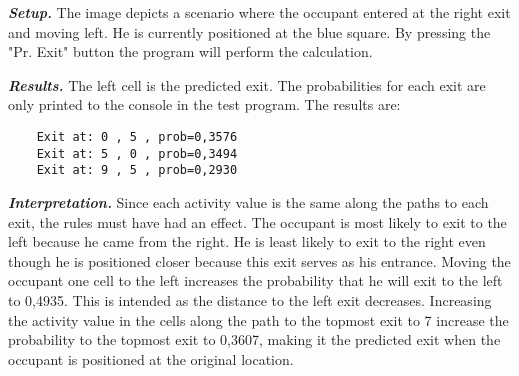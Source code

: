 \textit{\textbf{Setup.}} The image depicts a scenario where the occupant entered at the right exit and moving left. He is currently positioned at the blue square. By pressing the "Pr. Exit" button the program will perform the calculation. 

\textit{\textbf{Results.}} The left cell is the predicted exit. The probabilities for each exit are only printed to the console in the test program. The results are:
\begin{verbatim}
    Exit at: 0 , 5 , prob=0,3576
    Exit at: 5 , 0 , prob=0,3494
    Exit at: 9 , 5 , prob=0,2930
\end{verbatim}

\textit{\textbf{Interpretation.}} Since each activity value is the same along the paths to each exit, the rules must have had an effect. The occupant is most likely to exit to the left because he came from the right. He is least likely to exit to the right even though he is positioned closer because this exit serves as his entrance. Moving the occupant one cell to the left increases the probability that he will exit to the left to 0,4935. This is intended as the distance to the left exit decreases. Increasing the activity value in the cells along the path to the topmost exit to 7 increase the probability to the topmost exit to 0,3607, making it the predicted exit when the occupant is positioned at the original location.